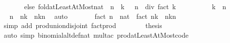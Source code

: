 \begin{isabellebody}
\ \ \ \ \ \ \ else\ {\isacharparenleft}{\kern0pt}fold{\isacharunderscore}{\kern0pt}atLeastAtMost{\isacharunderscore}{\kern0pt}nat\ {\isacharparenleft}{\kern0pt}{\isacharasterisk}{\kern0pt}{\isacharparenright}{\kern0pt}\ {\isacharparenleft}{\kern0pt}n\ {\isacharminus}{\kern0pt}\ k\ {\isacharplus}{\kern0pt}\ {}{\isacharparenright}{\kern0pt}\ n\ {}\ div\ fact\ k{\isacharparenright}{\kern0pt}{\isacharparenright}{\kern0pt}{\isachardoublequoteclose}\isanewline
%
\isadelimproof
%
\endisadelimproof
%
\isatagproof
{}\isamarkupfalse%
\ {\isacharminus}{\kern0pt}\isanewline
\ \ \isacommand{{\isacharbraceleft}{\kern0pt}}\isamarkupfalse%
\isanewline
\ \ \ \ \isamarkupfalse%
\ {\isachardoublequoteopen}k\ {\isasymle}\ n{\isachardoublequoteclose}\isanewline
\ \ \ \ \isamarkupfalse%
\ \isamarkupfalse%
\ {\isachardoublequoteopen}{\isacharbraceleft}{\kern0pt}{}{\isachardot}{\kern0pt}{\isachardot}{\kern0pt}n{\isacharbraceright}{\kern0pt}\ {\isacharequal}{\kern0pt}\ {\isacharbraceleft}{\kern0pt}{}{\isachardot}{\kern0pt}{\isachardot}{\kern0pt}n{\isacharminus}{\kern0pt}k{\isacharbraceright}{\kern0pt}\ {\isasymunion}\ {\isacharbraceleft}{\kern0pt}n{\isacharminus}{\kern0pt}k{\isacharplus}{\kern0pt}{}{\isachardot}{\kern0pt}{\isachardot}{\kern0pt}n{\isacharbraceright}{\kern0pt}{\isachardoublequoteclose}\ \isamarkupfalse%
\ auto\isanewline
\ \ \ \ \isamarkupfalse%
\ \isamarkupfalse%
\ {\isachardoublequoteopen}{\isacharparenleft}{\kern0pt}fact\ n\ {\isacharcolon}{\kern0pt}{\isacharcolon}{\kern0pt}\ nat{\isacharparenright}{\kern0pt}\ {\isacharequal}{\kern0pt}\ fact\ {\isacharparenleft}{\kern0pt}n{\isacharminus}{\kern0pt}k{\isacharparenright}{\kern0pt}\ {\isacharasterisk}{\kern0pt}\ {\isasymProd}{\isacharbraceleft}{\kern0pt}n{\isacharminus}{\kern0pt}k{\isacharplus}{\kern0pt}{}{\isachardot}{\kern0pt}{\isachardot}{\kern0pt}n{\isacharbraceright}{\kern0pt}{\isachardoublequoteclose}\isanewline
\ \ \ \ \ \ \isamarkupfalse%
\ {\isacharparenleft}{\kern0pt}simp\ add{\isacharcolon}{\kern0pt}\ prod{\isachardot}{\kern0pt}union{\isacharunderscore}{\kern0pt}disjoint\ fact{\isacharunderscore}{\kern0pt}prod{\isacharparenright}{\kern0pt}\isanewline
\ \ \isacommand{{\isacharbraceright}{\kern0pt}}\isamarkupfalse%
\isanewline
\ \ \isamarkupfalse%
\ \isamarkupfalse%
\ {\isacharquery}{\kern0pt}thesis\ \isamarkupfalse%
\ {\isacharparenleft}{\kern0pt}auto\ simp{\isacharcolon}{\kern0pt}\ binomial{\isacharunderscore}{\kern0pt}altdef{\isacharunderscore}{\kern0pt}nat\ mult{\isacharunderscore}{\kern0pt}ac\ prod{\isacharunderscore}{\kern0pt}atLeastAtMost{\isacharunderscore}{\kern0pt}code{\isacharparenright}{\kern0pt}\isanewline
{}\isamarkupfalse%
%
\endisatagproof
{\isafoldproof}%
%
\isadelimproof
\isanewline
%
\endisadelimproof
%
\isadelimtheory
\isanewline
%
\endisadelimtheory
%
\isatagtheory
{}\isamarkupfalse%
%
\endisatagtheory
{\isafoldtheory}%
%
\isadelimtheory
%
\endisadelimtheory
%
\end{isabellebody}%
